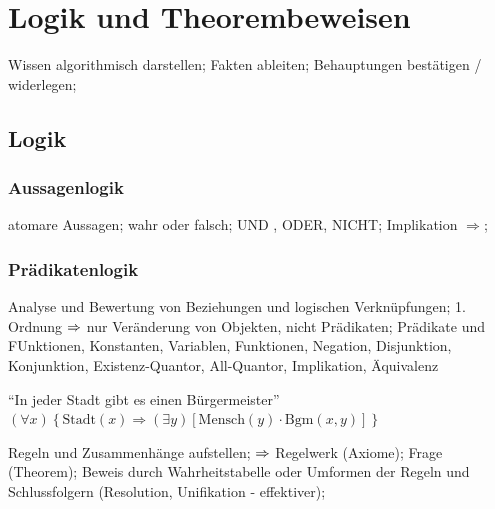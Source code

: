 \documentclass[german,color,6pt]{latex4ei/latex4ei_sheet}
\begin{document}
\section{Logik und Theorembeweisen}
\begin{sectionbox}
Wissen algorithmisch darstellen; Fakten ableiten; Behauptungen bestätigen / widerlegen; 
\end{sectionbox}

\subsection{Logik}
\begin{sectionbox}
\subsubsection{Aussagenlogik}
atomare Aussagen; wahr oder falsch; UND , ODER, NICHT; Implikation $\Rightarrow$; 
\end{sectionbox}

\begin{sectionbox}
\subsubsection{Prädikatenlogik}
Analyse und Bewertung von Beziehungen und logischen Verknüpfungen; 1. Ordnung $\Rightarrow$ nur Veränderung von Objekten, nicht Prädikaten; Prädikate und FUnktionen, Konstanten, Variablen, Funktionen, Negation, Disjunktion, Konjunktion, Existenz-Quantor, All-Quantor, Implikation, Äquivalenz

"`In jeder Stadt gibt es einen Bürgermeister"' 
$(\forall x) \left\{ \text{Stadt}(x)  \Rightarrow (\exists y) \left[ \text{Mensch}(y) \cdot \text{Bgm}(x,y) \right] \right\}$

Regeln und Zusammenhänge aufstellen; $\Rightarrow$ Regelwerk (Axiome); Frage (Theorem); Beweis durch Wahrheitstabelle oder Umformen der Regeln und Schlussfolgern (Resolution, Unifikation - effektiver); 
\end{sectionbox}
\end{document}
